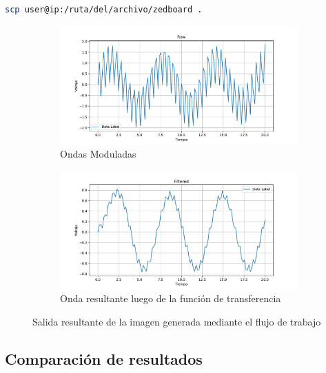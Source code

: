 \begin{lstlisting}[language=bash, caption={Copiar archivo por protocolo SSH, Linux}, label=lst:copy_ssh]
    scp user@ip:/ruta/del/archivo/zedboard .
\end{lstlisting}

\begin{figure}[htbp]
    \centering
    \begin{subfigure}[b]{0.45\textwidth}
        \centering
        \includegraphics[width=\textwidth]{fig/especifico_2/raw.pdf}
        \caption{Ondas Moduladas}
        \label{fig:onda_modulada_zedboard}
    \end{subfigure}
    \hfill
    \begin{subfigure}[b]{0.45\textwidth}
        \centering
        \includegraphics[width=\textwidth]{fig/especifico_2/Filtered.pdf}
        \caption{Onda resultante luego de la función de transferencia}
        \label{fig:onda_filtrada_zedboard}
    \end{subfigure}
    \caption{Salida resultante de la imagen generada mediante el flujo de trabajo}
    \label{fig:salida_resultante_diagrama_graficos_zedboard}
\end{figure}

\subsection{Comparación de resultados}

